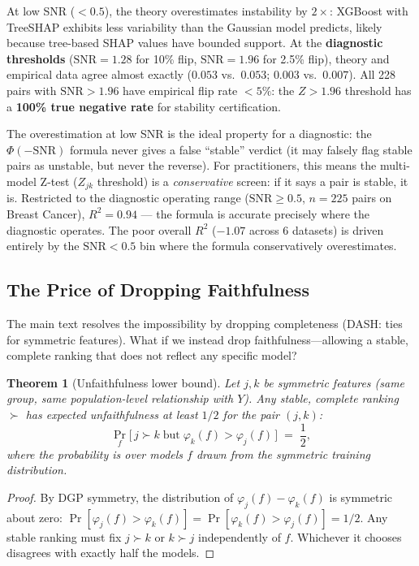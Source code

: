\documentclass{article}
\newtheorem{theorem}{Theorem}
\begin{document}
At low SNR ($< 0.5$), the theory overestimates instability by $2\times$:
XGBoost with TreeSHAP exhibits less variability than the Gaussian model
predicts, likely because tree-based SHAP values have bounded support.
At the \textbf{diagnostic thresholds} ($\text{SNR} = 1.28$ for 10\% flip,
$\text{SNR} = 1.96$ for 2.5\% flip), theory and empirical data agree
almost exactly ($0.053$ vs.\ $0.053$; $0.003$ vs.\ $0.007$).
All 228 pairs with $\text{SNR} > 1.96$ have empirical flip rate $< 5\%$:
the $Z > 1.96$ threshold has a \textbf{100\% true negative rate} for
stability certification.

The overestimation at low SNR is the ideal property for a diagnostic:
the $\Phi(-\text{SNR})$ formula never gives a false ``stable'' verdict
(it may falsely flag stable pairs as unstable, but never the reverse).
For practitioners, this means the multi-model Z-test ($Z_{jk}$ threshold)
is a \emph{conservative} screen: if it says a pair is stable, it is.
Restricted to the diagnostic operating range ($\text{SNR} \geq 0.5$,
$n = 225$ pairs on Breast Cancer), $R^2 = 0.94$ --- the formula is
accurate precisely where the diagnostic operates. The poor overall
$R^2$ ($-1.07$ across 6 datasets) is driven entirely by the
$\text{SNR} < 0.5$ bin where the formula conservatively overestimates.

\subsection{The Price of Dropping Faithfulness}

The main text resolves the impossibility by dropping completeness
(DASH: ties for symmetric features). What if we instead drop
faithfulness---allowing a stable, complete ranking that does not
reflect any specific model?

\begin{theorem}[Unfaithfulness lower bound]
\label{thm:unfaithfulness}
Let $j, k$ be symmetric features (same group, same population-level
relationship with $Y$). Any stable, complete ranking $\succ$ has
expected unfaithfulness at least $1/2$ for the pair $(j,k)$:
\[
    \Pr_f\bigl[\, j \succ k \;\text{but}\;
    \varphi_k(f) > \varphi_j(f) \,\bigr] \;=\; \frac{1}{2},
\]
where the probability is over models $f$ drawn from the symmetric
training distribution.
\end{theorem}

\begin{proof}
By DGP symmetry, the distribution of $\varphi_j(f) - \varphi_k(f)$
is symmetric about zero:
$\Pr[\varphi_j(f) > \varphi_k(f)] = \Pr[\varphi_k(f) > \varphi_j(f)] = 1/2$.
Any stable ranking must fix $j \succ k$ or $k \succ j$ independently
of $f$. Whichever it chooses disagrees with exactly half the models.
\end{proof}
\end{document}

